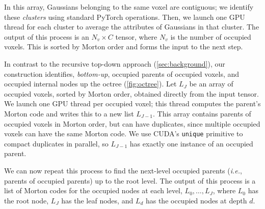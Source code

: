 In this array, Gaussians belonging to the same voxel are contiguous; we identify these \textit{clusters} using standard PyTorch operations.
%
Then, we launch one GPU thread for each cluster to average the attributes of Gaussians in that cluster.
%
The output of this process is an $N_v \times C$ tensor, where $N_v$ is the number of occupied voxels.
%
This is sorted by Morton order and forms the input to the next step.

%
In contrast to the recursive top-down approach (\cref{sec:background}),
our construction identifies, \textit{bottom-up}, occupied parents of occupied voxels, and occupied internal nodes up the octree (\cref{fig:octree}).
%
Let $L_J$ be an array of occupied voxels, sorted by Morton order, obtained directly from the input tensor.
%
We launch one GPU thread per occupied voxel; this thread computes the parent's Morton code and writes this to a new list $L_{J-1}$.
%
This array contains parents of occupied voxels in Morton order, but can have duplicates, since multiple occupied voxels can have the same Morton code.
%
We use CUDA's \texttt{unique} primitive to compact duplicates in parallel, so $L_{J-1}$ has exactly one instance of an occupied parent.

We can now repeat this process to find the next-level occupied parents (\textit{i.e.}, parents of occupied parents) up to the root level.
%
The output of this process is a list of Morton codes for the occupied nodes at each level, \ie $L_0,\ldots,L_J$, where $L_0$ has the root node, $L_J$ has the leaf nodes, and $L_d$ has the occupied nodes at depth $d$.

